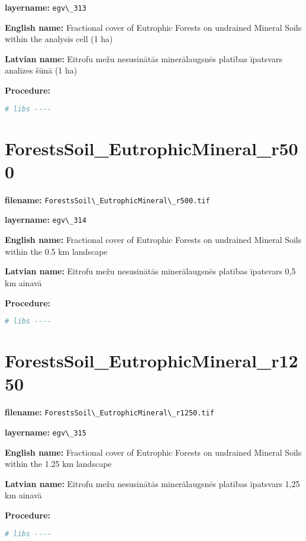 \documentclass[
]{book}
\newcommand{\passthrough}[1]{#1}
\begin{document}
\textbf{layername:} \passthrough{\lstinline!egv\_313!}

\textbf{English name:} Fractional cover of Eutrophic Forests on undrained Mineral Soils within the analysis cell (1 ha)

\textbf{Latvian name:} Eitrofu mežu nesusinātās minerālaugsnēs platības īpatsvars analīzes šūnā (1 ha)

\textbf{Procedure:}

\begin{lstlisting}[language=R]
# libs ----
\end{lstlisting}

\section{ForestsSoil\_EutrophicMineral\_r500}\label{ch06.314}

\textbf{filename:} \passthrough{\lstinline!ForestsSoil\_EutrophicMineral\_r500.tif!}

\textbf{layername:} \passthrough{\lstinline!egv\_314!}

\textbf{English name:} Fractional cover of Eutrophic Forests on undrained Mineral Soils within the 0.5 km landscape

\textbf{Latvian name:} Eitrofu mežu nesusinātās minerālaugsnēs platības īpatsvars 0,5 km ainavā

\textbf{Procedure:}

\begin{lstlisting}[language=R]
# libs ----
\end{lstlisting}

\section{ForestsSoil\_EutrophicMineral\_r1250}\label{ch06.315}

\textbf{filename:} \passthrough{\lstinline!ForestsSoil\_EutrophicMineral\_r1250.tif!}

\textbf{layername:} \passthrough{\lstinline!egv\_315!}

\textbf{English name:} Fractional cover of Eutrophic Forests on undrained Mineral Soils within the 1.25 km landscape

\textbf{Latvian name:} Eitrofu mežu nesusinātās minerālaugsnēs platības īpatsvars 1,25 km ainavā

\textbf{Procedure:}

\begin{lstlisting}[language=R]
# libs ----
\end{lstlisting}
\end{document}
